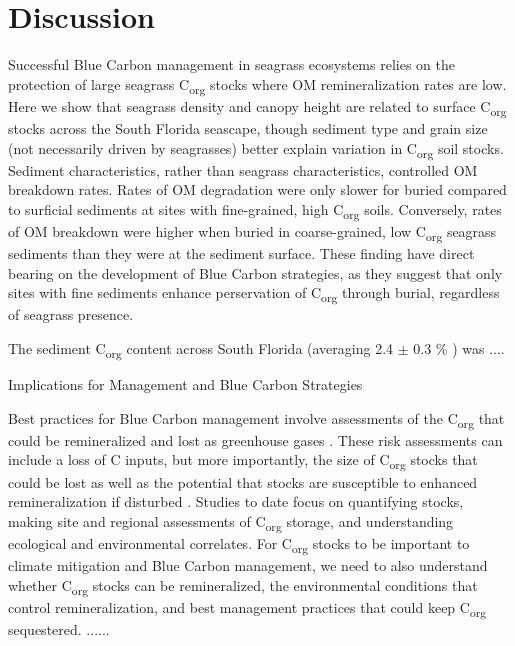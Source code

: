 \section{Discussion}

Successful Blue Carbon management in seagrass ecosystems relies on the protection of large seagrass C\textsubscript{org} stocks where OM remineralization rates are low. Here we show that seagrass density and canopy height are related to surface C\textsubscript{org} stocks across the South Florida seascape, though sediment type and grain size (not necessarily driven by seagrasses) better explain variation in C\textsubscript{org} soil stocks. Sediment characteristics, rather than seagrass characteristics, controlled OM breakdown rates. Rates of OM degradation were only slower for buried compared to surficial sediments at sites with fine-grained, high C\textsubscript{org} soils. Conversely, rates of OM breakdown were higher when buried in coarse-grained, low C\textsubscript{org} seagrass sediments than they were at the sediment surface. These finding have direct bearing on the development of Blue Carbon strategies, as they suggest that only sites with fine sediments enhance perservation of C\textsubscript{org} through burial, regardless of seagrass presence.

The sediment C\textsubscript{org} content across South Florida (averaging 2.4 $\pm$ 0.3 \% ) was ....

\bigskip
\noindent Implications for Management and Blue Carbon Strategies
\medskip

Best practices for Blue Carbon management involve assessments of the C\textsubscript{org} that could be remineralized and lost as greenhouse gases \citep{Howard:2017kp}. These risk assessments can include a loss of C inputs, but more importantly, the size of C\textsubscript{org} stocks that could be lost as well as the potential that stocks are susceptible to enhanced remineralization if disturbed \citep{Lovelock:2017ez}. Studies to date focus on quantifying stocks, making site and regional assessments of C\textsubscript{org} storage, and understanding ecological and environmental correlates. For C\textsubscript{org} stocks to be important to climate mitigation and Blue Carbon management, we need to also understand whether C\textsubscript{org} stocks can be remineralized, the environmental conditions that control remineralization, and best management practices that could keep C\textsubscript{org} sequestered.
......



